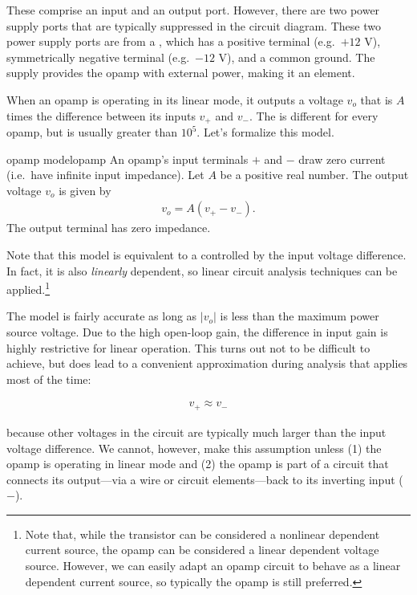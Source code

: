 \documentclass[electronics.tex]{subfiles}
\begin{document}
These comprise an input and an output port.
However, there are two power supply ports that are typically suppressed in the circuit diagram.
These two power supply ports are from a , which has a positive terminal (e.g.\ $+12$ V), symmetrically negative terminal (e.g.\ $-12$ V), and a common ground.
The supply provides the opamp with external power, making it an  element.
\tags{}

When an opamp is operating in its linear mode, it outputs a voltage $v_o$ that is $A$ times the difference between its inputs $v_+$ and $v_-$.
The  is different for every opamp, but is usually greater than $10^5$.
Let's formalize this model.

\begin{Definition}{opamp model}{opamp}
	An opamp's input terminals $+$ and $-$ draw zero current (i.e.\ have infinite input impedance).
	Let $A$ be a positive real number.
	The output voltage $v_o$ is given by
	\begin{align*}
		v_o = A (v_+ - v_-).
	\end{align*}
	The output terminal has zero impedance.
\end{Definition}

Note that this model is equivalent to a  controlled by the input voltage difference.
In fact, it is also \emph{linearly} dependent, so linear circuit analysis techniques can be applied.\footnote{Note that, while the transistor can be considered a nonlinear dependent current source, the opamp can be considered a linear dependent voltage source. However, we can easily adapt an opamp circuit to behave as a linear dependent current source, so typically the opamp is still preferred.}

The model is fairly accurate as long as $|v_o|$ is less than the maximum power source voltage.
Due to the high open-loop gain, the difference in input gain is highly restrictive for linear operation.
This turns out not to be difficult to achieve, but does lead to a convenient approximation during analysis that applies most of the time:

\begin{align}
	\label{eq:v_plus_minus}
	v_+ \approx v_-
\end{align}

because other voltages in the circuit are typically much larger than the input voltage difference.
We cannot, however, make this assumption unless (1) the opamp is operating in linear mode and (2) the opamp is part of a circuit that connects its output---via a wire or circuit elements---back to its inverting input ($-$).
\end{document}
